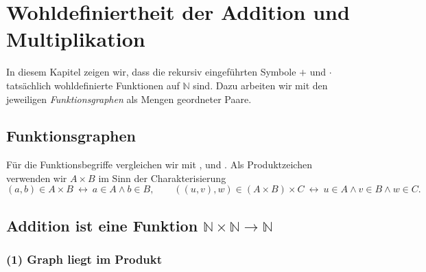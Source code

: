 \documentclass[main.tex]{subfiles}
\begin{document}
\chapter{Wohldefiniertheit der Addition und Multiplikation}

In diesem Kapitel zeigen wir, dass die rekursiv eingeführten Symbole \(+\) und \(\cdot\)
tatsächlich wohldefinierte Funktionen auf \(\mathbb{N}\) sind. Dazu arbeiten wir
mit den jeweiligen \emph{Funktionsgraphen} als Mengen geordneter Paare.

\section{Funktionsgraphen}



\begin{remark}
Für die Funktionsbegriffe vergleichen wir mit ,
 und
.
Als Produktzeichen verwenden wir \(A\times B\) im Sinn der Charakterisierung
\[
(a,b)\in A\times B \ \leftrightarrow\ a\in A \land b\in B,\qquad
((u,v),w)\in (A\times B)\times C \ \leftrightarrow\ u\in A \land v\in B \land w\in C.
\]
\end{remark}

\section{Addition ist eine Funktion \( \mathbb{N}\times\mathbb{N} \to \mathbb{N}\)}

\subsection*{(1) Graph liegt im Produkt}

\begin{tabproofwide}
    {}
    {}
    {}
\end{tabproofwide}
\end{document}
